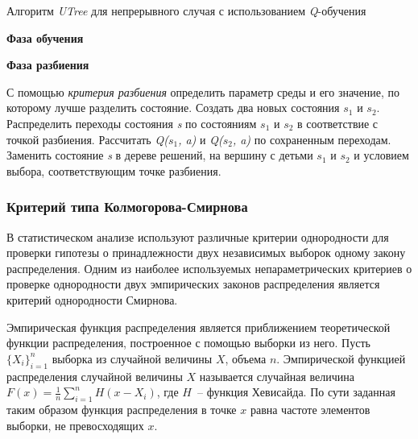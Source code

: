 \begin{algorithm}[h!]
    \caption{Алгоритм \textit{UTree} для непрерывного случая с использованием \textit{Q}-обучения}
    \label{utree_scheme}
    \textbf{Фаза обучения}
    \begin{algorithmic}[1]
    \end{algorithmic}
    \textbf{Фаза разбиения}
    \begin{algorithmic}[1]
            \ENDFOR
            \STATE С помощью \textit{критерия разбиения} определить параметр среды и его значение, по которому лучше разделить состояние.
                \STATE Создать два новых состояния $s_1$ и $s_2$.
                \STATE Распределить переходы состояния \textit{s} по состояниям $s_1$ и $s_2$ в соответствие с точкой разбиения.
                \STATE Рассчитать \textit{Q($s_1$, a)} и \textit{Q($s_2$, a)} по сохраненным переходам.
                \STATE Заменить состояние \textit{s} в дереве решений, на вершину с детьми $s_1$ и $s_2$ и условием выбора, соответствующим точке разбиения.
            \ENDIF
        \ENDFOR
    \end{algorithmic}
\end{algorithm}

\subsubsection{Критерий типа Колмогорова-Смирнова}
\label{ks_criteria}
В статистическом анализе используют различные критерии однородности для проверки гипотезы о принадлежности двух независимых выборок одному закону распределения. Одним из наиболее используемых непараметрических критериев о проверке однородности двух эмпирических законов распределения является критерий однородности Смирнова.

Эмпирическая функция распределения является приближением теоретической функции распределения, построенное с помощью выборки из него. Пусть $\{X_i\}_{i = 1}^n$ выборка из случайной величины $X$, объема $n$. Эмпирической функцией распределения случайной величины $X$ называется случайная величина $F(x) = \frac{1}{n}\sum\limits_{i = 1}^n{H(x - X_i)}$, где $H$~-- функция Хевисайда. По сути заданная таким образом функция распределения в точке $x$ равна частоте элементов выборки, не превосходящих $x$.


